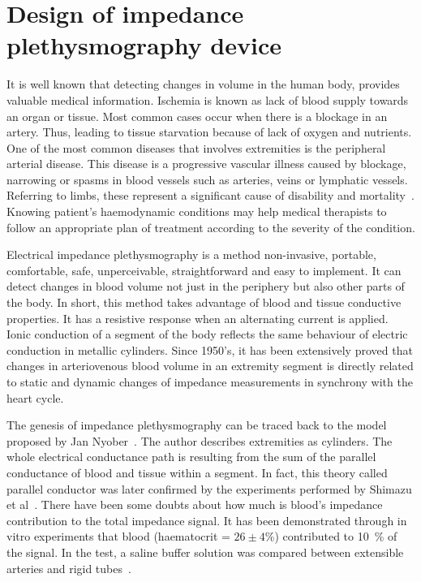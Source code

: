 
\chapter{Design of impedance plethysmography device}
\label{chapter design}

\ifpdf
    \graphicspath{{Chapter4/Figs/Raster/}{Chapter4/Figs/PDF/}{Chapter4/Figs/}}
\else
    \graphicspath{{Chapter4/Figs/Vector/}{Chapter4/Figs/}}
\fi


It is well known that detecting changes in volume in the human body, provides valuable medical information. Ischemia is known as lack of blood supply towards an organ or tissue. Most common cases occur when there is a blockage in an artery. Thus, leading to tissue starvation because of lack of oxygen and nutrients. One of the most common diseases that involves extremities is the peripheral arterial disease. This disease is a progressive vascular illness caused by blockage, narrowing or spasms in blood vessels such as arteries, veins or lymphatic vessels. Referring to limbs, these represent a significant cause of disability and mortality~\cite{novo1995patients}. Knowing patient's haemodynamic conditions may help medical therapists to follow an appropriate plan of treatment according to the severity of the condition.

Electrical impedance plethysmography is a method non-invasive, portable, comfortable, safe, unperceivable, straightforward and easy to implement.  It can detect changes in blood volume not just in the periphery but also other parts of the body. In short, this method takes advantage of blood and tissue conductive properties. It has a resistive response when an alternating current is applied. Ionic conduction of a segment of the body reflects the same behaviour of electric conduction in metallic cylinders. Since 1950's, it has been extensively proved that changes in arteriovenous blood volume in an extremity segment is directly related to static and dynamic changes of impedance measurements in synchrony with the heart cycle.

The genesis of impedance plethysmography can be traced back to the model proposed by Jan Nyober~\cite{nyober1950electrical}. The author describes extremities as cylinders. The whole electrical conductance path is resulting from the sum of the parallel conductance of blood and tissue within a segment. In fact, this theory called parallel conductor was later confirmed by the experiments performed by Shimazu et al~\cite{shimazu1982evaluation}. There have been some doubts about how much is blood's impedance contribution to the total impedance signal.  It has been demonstrated through in vitro experiments that blood (haematocrit = $ 26 \pm 4 \%$) contributed to \SI{10}{\percent} of the signal. In the test, a saline buffer solution was compared between extensible arteries and rigid tubes~\cite{peura1978influence}. 

